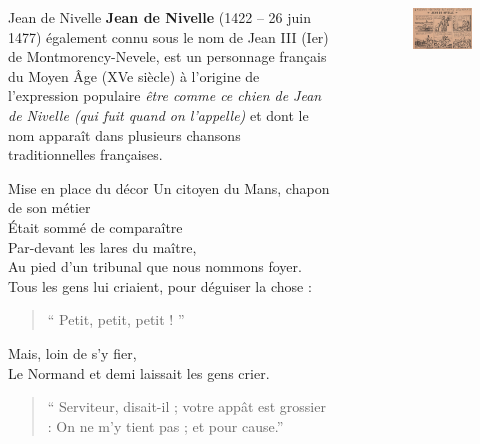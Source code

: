 \documentclass{LaBRI_poster}
\begin{document}
\begin{frame}[t]
\begin{columns}[t]
\begin{column}{\twocolwidth}
\vspace{5pt}

\begin{alertblock}{Jean de Nivelle}
\textbf{Jean de Nivelle} (1422 -- 26 juin 1477) également connu sous le nom de Jean III (Ier) de Montmorency-Nevele, est un personnage français du Moyen Âge (XVe siècle) à l'origine de l'expression populaire \emph{être comme ce chien de Jean de Nivelle (qui fuit quand on l'appelle)} et dont le nom apparaît dans plusieurs chansons traditionnelles françaises.
\end{alertblock}

\vspace{5pt}

\begin{block}{Mise en place du décor}
Un citoyen du Mans, chapon de son métier\\
Était sommé de comparaître\\
Par-devant les lares du maître,\\
Au pied d’un tribunal que nous nommons foyer.\\
Tous les gens lui criaient, pour déguiser la chose :\\
\begin{quote}
`` Petit, petit, petit ! ''
\end{quote}
 Mais, loin de s’y fier,\\
Le Normand et demi laissait les gens crier.\\
\begin{quote}
`` Serviteur, disait-il ; votre appât est grossier :
On ne m’y tient pas ; et pour cause.''
\end{quote}
\end{block}

\end{column}

\begin{column}{\sepwidth}\end{column}

\begin{column}{\twocolwidth}


\begin{figure}
\includegraphics[width=\textwidth]{jean_de_nivelle.jpg}
\end{figure}


\end{column}
\end{columns}
\end{frame}
\end{document}
